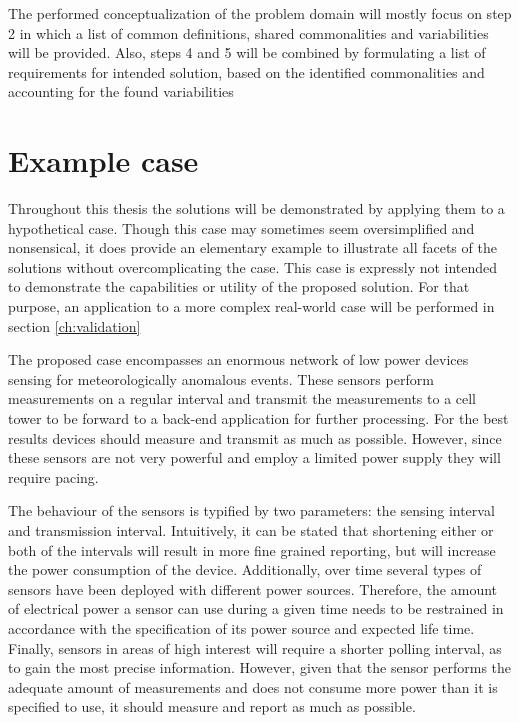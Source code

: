 The performed conceptualization of the problem domain will mostly focus on step 2 in which a list of common definitions, shared commonalities and variabilities will be provided. Also, steps 4 and 5 will be combined by formulating a list of requirements for intended solution, based on the identified commonalities and accounting for the found variabilities

\section{Example case}
\label{sec:example_case}
Throughout this thesis the solutions will be demonstrated by applying them to a hypothetical case. Though this case may sometimes seem oversimplified and nonsensical, it does provide an elementary example to illustrate all facets of the solutions without overcomplicating the case. This case is expressly not intended to demonstrate the capabilities or utility of the proposed solution. For that purpose, an application to a more complex real-world case will be performed in section \ref{ch:validation}

The proposed case encompasses an enormous network of low power devices sensing for meteorologically anomalous events. These sensors perform measurements on a regular interval and transmit the measurements to a cell tower to be forward to a back-end application for further processing. For the best results devices should measure and transmit as much as possible. However, since these sensors are not very powerful and employ a limited power supply they will require pacing.

The behaviour of the sensors is typified by two parameters: the sensing interval and transmission interval. Intuitively, it can be stated that shortening either or both of the intervals will result in more fine grained reporting, but will increase the power consumption of the device. Additionally, over time several types of sensors have been deployed with different power sources. Therefore, the amount of electrical power a sensor can use during a given time needs to be restrained in accordance with the specification of its power source and expected life time. Finally, sensors in areas of high interest will require a shorter polling interval, as to gain the most precise information. However, given that the sensor performs the adequate amount of measurements and does not consume more power than it is specified to use, it should measure and report as much as possible.


